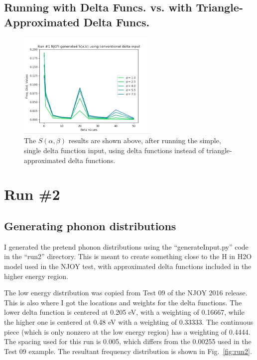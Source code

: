 \documentclass[a4paper]{article}
\begin{document}
\subsection{Running with Delta Funcs. vs. with Triangle-Approximated Delta Funcs.}
\begin{figure}[H]
\centering
\includegraphics[width=0.6\textwidth]{run1_sab_using_just_delta_funcs.png}
\caption{\label{fig:run2_just_delta} The $S(\alpha,\beta)$ results are shown above, after running the simple, single delta function input, using delta functions instead of triangle-approximated delta functions.}
\end{figure}


\newpage


\section{Run \#2}
\subsection{Generating phonon distributions}
I generated the pretend phonon distributions using the ``generateInput.py'' code in the ``run2'' directory. This is meant to create something close to the H in H2O model used in the NJOY test, with approximated delta functions included in the higher energy region.\par
The low energy distribution was copied from Test 09 of the NJOY 2016 release. This is also where I got the locations and weights for the delta functions. The lower delta function is centered at 0.205 eV, with a weighting of 0.16667, while the higher one is centered at 0.48 eV with a weighting of 0.33333. The continuous piece (which is only nonzero at the low energy region) has a weighting of 0.4444. The spacing used for this run is 0.005, which differs from the 0.00255 used in the Test 09 example. The resultant frequency distribution is shown in Fig.~\ref{fig:run2}.\par
\end{document}
